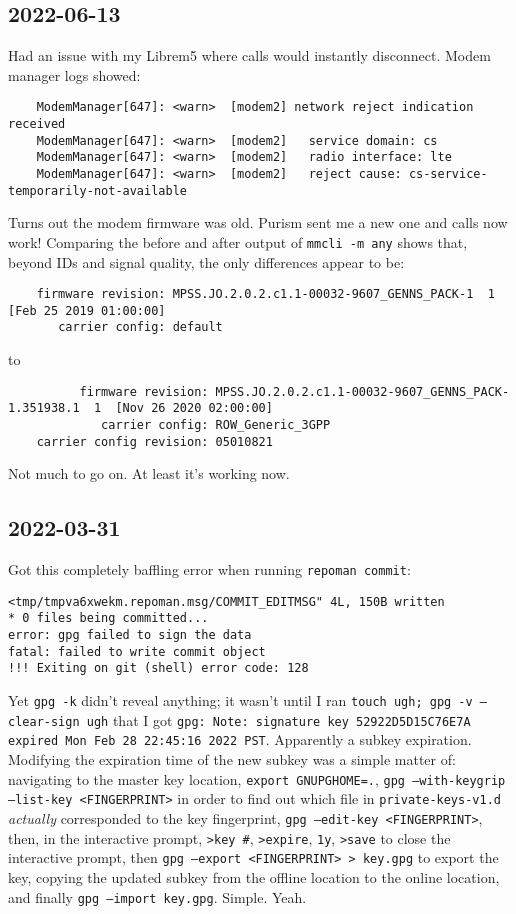 \documentclass{article}
\begin{document}
\subsection{2022-06-13}
Had an issue with my Librem5 where calls would instantly disconnect.  Modem manager logs showed:
\begin{verbatim}
	ModemManager[647]: <warn>  [modem2] network reject indication received
	ModemManager[647]: <warn>  [modem2]   service domain: cs
	ModemManager[647]: <warn>  [modem2]   radio interface: lte
	ModemManager[647]: <warn>  [modem2]   reject cause: cs-service-temporarily-not-available
\end{verbatim}
Turns out the modem firmware was old.  Purism sent me a new one and calls now work!  Comparing the before and after output of \texttt{mmcli -m any} shows that, beyond IDs and signal quality, the only differences appear to be:
\begin{verbatim}
	firmware revision: MPSS.JO.2.0.2.c1.1-00032-9607_GENNS_PACK-1  1  [Feb 25 2019 01:00:00]
	   carrier config: default
\end{verbatim}
to
\begin{verbatim}
	      firmware revision: MPSS.JO.2.0.2.c1.1-00032-9607_GENNS_PACK-1.351938.1  1  [Nov 26 2020 02:00:00]
	         carrier config: ROW_Generic_3GPP
	carrier config revision: 05010821
\end{verbatim}
Not much to go on.  At least it's working now.

\subsection{2022-03-31}
Got this completely baffling error when running \texttt{repoman commit}:
\begin{verbatim}
<tmp/tmpva6xwekm.repoman.msg/COMMIT_EDITMSG" 4L, 150B written
* 0 files being committed...
error: gpg failed to sign the data
fatal: failed to write commit object
!!! Exiting on git (shell) error code: 128
\end{verbatim}
Yet \texttt{gpg -k} didn't reveal anything; it wasn't until I ran \texttt{touch ugh; gpg -v --clear-sign ugh} that I got \texttt{gpg: Note: signature key 52922D5D15C76E7A expired Mon Feb 28 22:45:16 2022 PST}.  Apparently a subkey expiration.  Modifying the expiration time of the new subkey was a simple matter of: navigating to the master key location, \texttt{export GNUPGHOME=.}, \texttt{gpg --with-keygrip --list-key <FINGERPRINT>} in order to find out which file in \texttt{private-keys-v1.d} \emph{actually} corresponded to the key fingerprint, \texttt{gpg --edit-key <FINGERPRINT>}, then, in the interactive prompt, \texttt{>key #}, \texttt{>expire}, \texttt{1y}, \texttt{>save} to close the interactive prompt, then \texttt{gpg --export <FINGERPRINT> > key.gpg} to export the key, copying the updated subkey from the offline location to the online location, and finally \texttt{gpg --import key.gpg}.  Simple.  Yeah.
\end{document}
